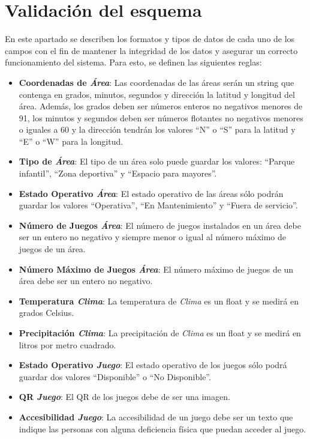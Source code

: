 \documentclass[]{article}
\begin{document}
\section{Validación del esquema}
\label{sec:esquema}
En este apartado se describen los formatos y tipos de datos de cada uno de los campos con el fin de mantener la integridad de los datos y asegurar un correcto funcionamiento del sistema. Para esto, se definen las siguientes reglas:
\begin{itemize}
    \item \textbf{Coordenadas de \textit{Área}}: Las coordenadas de las áreas serán un string que contenga en grados, minutos, segundos y dirección la latitud y longitud del área. Además, los grados deben ser números enteros no negativos menores de 91, los minutos y segundos deben ser números flotantes no negativos menores o iguales a 60 y la dirección tendrán los valores ``N'' o ``S'' para la latitud y ``E'' o ``W'' para la longitud.
    \item \textbf{Tipo de \textit{Área}}: El tipo de un área solo puede guardar los valores: ``Parque infantil'', ``Zona deportiva'' y ``Espacio para mayores''.
    \item \textbf{Estado Operativo \textit{Área}}: El estado operativo de las áreas sólo podrán guardar los valores ``Operativa'', ``En Mantenimiento'' y ``Fuera de servicio''.
    \item \textbf{Número de Juegos \textit{Área}}: El número de juegos instalados en un área debe ser un entero no negativo y siempre menor o igual al número máximo de juegos de un área.
    \item \textbf{Número Máximo de Juegos \textit{Área}}: El número máximo de juegos de un área debe ser un entero no negativo.
    \item \textbf{Temperatura \textit{Clima}}: La temperatura de \textit{Clima} es un float y se medirá en grados Celsius.
    \item \textbf{Precipitación \textit{Clima}}: La precipitación de \textit{Clima} es un float y se medirá en litros por metro cuadrado.
    \item \textbf{Estado Operativo \textit{Juego}}: El estado operativo de los juegos sólo podrá guardar dos valores ``Disponible'' o ``No Disponible''.
    \item \textbf{QR \textit{Juego}}: El QR de los juegos debe de ser una imagen.
    \item \textbf{Accesibilidad \textit{Juego}}: La accesibilidad de un juego debe ser un texto que indique las personas con alguna deficiencia física que puedan acceder al juego.

\end{itemize}
\end{document}
